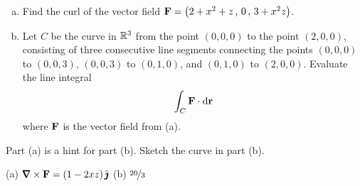 \begin{question}[M317 2012D] %
\begin{enumerate}[(a)]
\item
Find the curl of the vector field 
$\mathbf{F}  = \big(2 + x^2 + z\,,\, 0\,,\, 3 + x^2 z\big)$.
\item
Let $C$ be the curve in $\mathbb{R}^3$ from the point $(0, 0, 0)$ to 
the point $(2, 0, 0)$, consisting of three consecutive line segments 
connecting the points $(0, 0, 0)$ to $(0, 0, 3)$,
$(0, 0, 3)$ to $(0, 1, 0)$, and $(0, 1, 0)$ to $(2, 0, 0)$. 
Evaluate the line integral
\begin{equation*}
\int_C \mathbf{F}\cdot\mathrm{d}\mathbf{r} 
\end{equation*}
where $\mathbf{F}$ is the vector field from (a).
\end{enumerate}
\end{question}

\begin{hint} 
Part (a) is a hint for part (b). Sketch the curve in part (b).
\end{hint}

\begin{answer} 
(a) $\vnabla\times\vF=(1-2xz)\,\hj$\qquad
(b) $\nicefrac{20}{3}$
\end{answer}


